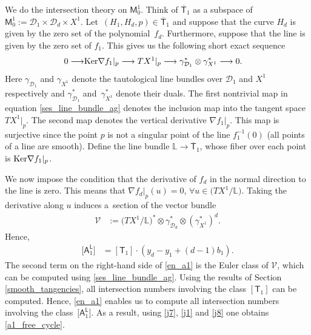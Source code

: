 \documentclass[pdftex]{sigma}
\numberwithin{equation}{section}
\begin{document}
We do the intersection theory on
$\mathsf{M}^1_0$. Think of $\overline{\mathsf{T}}_1$ as a subspace of
$\mathsf{M}^1_0 := \mathcal{D}_1 \times \mathcal{D}_d \times X^1$.
Let~${(H_1, H_d, p) \in \overline{\mathsf{T}}_1}$ and
suppose that the curve $H_d$ is given by the zero set of the polynomial~$f_d$.
Furthermore, suppose that the line is given by the zero set of $f_1$.
This gives us the following short exact sequence
\begin{align}
0 \longrightarrow & \textnormal{Ker} \nabla f_1|_{p} \longrightarrow TX^1|_{p} \longrightarrow
 \gamma_{\mathcal{D}_1}^* \otimes \gamma_{X^1}^* \longrightarrow 0. \label{ses_line_bundle_ag}
\end{align}
Here $\gamma_{\mathcal{D}_1}$ and $\gamma_{X^1}$ denote the tautological line bundles over $\mathcal{D}_1$
and $X^1$ respectively and $\gamma_{\mathcal{D}_1}^*$ and~$\gamma_{X^1}^*$ denote their duals.
The first nontrivial map in equation \eqref{ses_line_bundle_ag} denotes the inclusion map into the tangent space
$T X^1|_{p}$. The second map denotes the vertical derivative
$\nabla f_1|_{p}$. This map is surjective since the point $p$ is not a singular point of the line
$f_1^{-1}(0)$ (all points of a line are smooth). Define the line bundle
$\mathbb{L} \longrightarrow \overline{\mathsf{T}}_1$, whose fiber over each point is
$\textnormal{Ker} \nabla f_1|_{p}$.

We now impose the condition that the derivative of $f_d$ in the normal direction
to the line is zero.
This means that
$
\nabla f_d|_{p}(u)  = 0 $, $\forall  u \in \bigl(T X^1/\mathbb{L}\bigr)$.
Taking the derivative along $u$ induces a~section of the vector bundle
\begin{align}
\mathcal{V} &:= \bigl(TX^1/\mathbb{L}\bigr)^* \otimes \gamma_{\mathcal{D}_d}^* \otimes (\gamma_{X^1}^{*})^{d}. \label{bundle_normal}
\end{align}
Hence,
\begin{align}
\bigl[\mathsf{A}_1^{\mathsf{L}}\bigr] &  =  [\mathsf{T}_1]\cdot (y_d-y_1 + (d-1)b_1).\label{en_a1}
\end{align}
The second term on the right-hand side of \eqref{en_a1} is the Euler class of $\mathcal{V}$, which can
be computed using \eqref{ses_line_bundle_ag}.
Using the results of Section \ref{smooth_tangencies}, all intersection numbers involving the class
$[\mathsf{T}_1]$ can be computed. Hence, \eqref{en_a1}
enables us to compute all intersection numbers involving the class~$\bigl[\mathsf{A}_1^{\mathsf{L}}\bigr]$.
As a result, using \eqref{j7}, \eqref{j1} and \eqref{j8}
one obtains \eqref{a1_free_cycle}.
\end{document}
